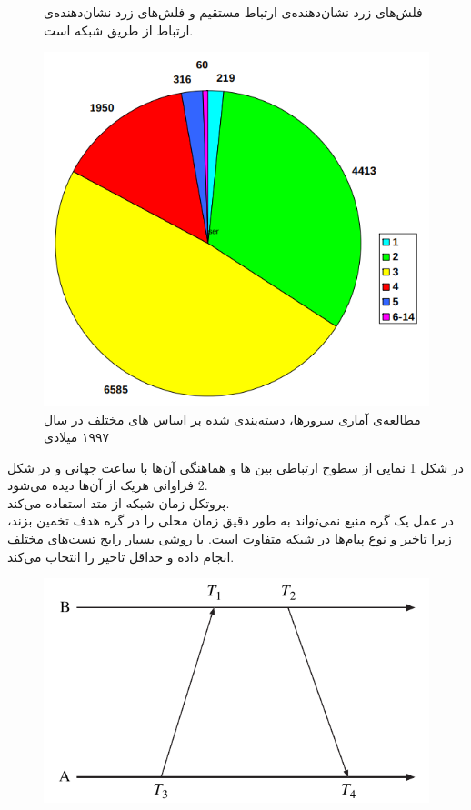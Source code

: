 \documentclass{article}
\begin{document}
\begin{multicols}{2}
\begin{figure}[H]
    \caption{فلش‌های زرد نشان‌دهنده‌ی ارتباط مستقیم و فلش‌های زرد نشان‌دهنده‌ی ارتباط از طریق شبکه است.}
    \label{fig:my_label}
\end{figure}
\begin{figure}[H]
    \centering
    \includegraphics[width=0.85\linewidth]{Photos/HW2/stratum.png}
    \caption{مطالعه‌ی آماری سرورها، دسته‌بندی شده بر اساس
    های مختلف در سال ۱۹۹۷ میلادی}
    \label{fig:my_label}
\end{figure}
در شکل 1 نمایی از سطوح ارتباطی بین
ها و هماهنگی آن‌ها با ساعت جهانی و در شکل 2 فراوانی هریک از آن‌ها دیده می‌شود.\\
پروتکل زمان شبکه از متد
استفاده می‌کند.\\
در عمل یک گره منبع نمی‌تواند به طور دقیق زمان محلی را در گره هدف تخمین بزند، زیرا تاخیر و نوع پیام‌ها در شبکه متفاوت است.
با روشی بسیار رایج تست‌های مختلف انجام داده و حداقل تاخیر را انتخاب می‌کند.\\
\begin{figure}[H]
    \centering
    \includegraphics[width=0.99\linewidth]{Photos/HW2/delay.png}

\end{figure}
\end{multicols}
\end{document}
